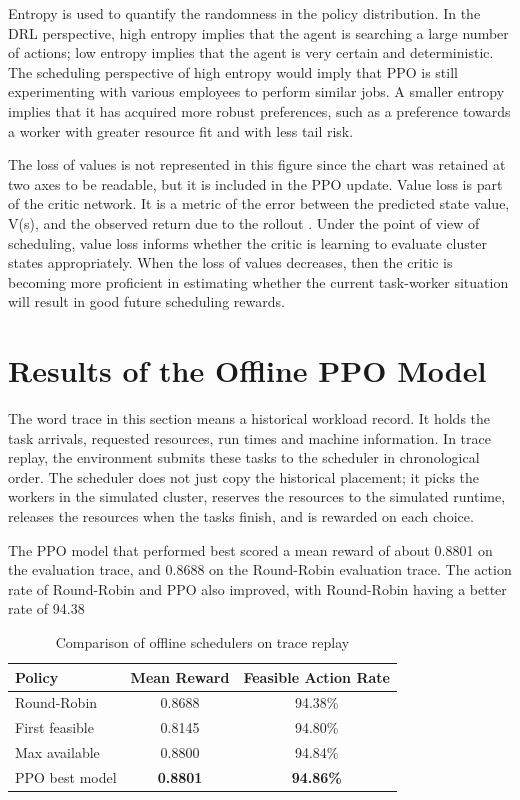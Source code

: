 Entropy is used to quantify the randomness in the policy distribution. In the DRL perspective, high entropy implies that the agent is searching a large number of actions; low entropy implies that the agent is very certain and deterministic. The scheduling perspective of high entropy would imply that PPO is still experimenting with various employees to perform similar jobs. A smaller entropy implies that it has acquired more robust preferences, such as a preference towards a worker with greater resource fit and with less tail risk.

The loss of values is not represented in this figure since the chart was retained at two axes to be readable, but it is included in the PPO update. Value loss is part of the critic network. It is a metric of the error between the predicted state value, V(s), and the observed return due to the rollout \cite{schulman2017ppo}. Under the point of view of scheduling, value loss informs whether the critic is learning to evaluate cluster states appropriately. When the loss of values decreases, then the critic is becoming more proficient in estimating whether the current task-worker situation will result in good future scheduling rewards.

\section{Results of the Offline PPO Model}

The word trace in this section means a historical workload record. It holds the task arrivals, requested resources, run times and machine information. In trace replay, the environment submits these tasks to the scheduler in chronological order. The scheduler does not just copy the historical placement; it picks the workers in the simulated cluster, reserves the resources to the simulated runtime, releases the resources when the tasks finish, and is rewarded on each choice.

The PPO model that performed best scored a mean reward of about 0.8801 on the evaluation trace, and 0.8688 on the Round-Robin evaluation trace. The action rate of Round-Robin and PPO also improved, with Round-Robin having a better rate of 94.38%

\begin{table}[H]
\centering
\caption{Comparison of offline schedulers on trace replay}
\label{tab:offline_results}
\begin{tabular}{lcc}
\toprule
Policy & Mean Reward & Feasible Action Rate \\
\midrule
Round-Robin & 0.8688 & 94.38\% \\
First feasible & 0.8145 & 94.80\% \\
Max available & 0.8800 & 94.84\% \\
PPO best model & \textbf{0.8801} & \textbf{94.86\%} \\
\bottomrule
\end{tabular}
\end{table}

